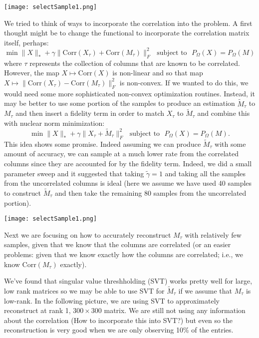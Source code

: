 \documentclass[12pt]{article}
\newcommand{\Corr}{\text{Corr}}
\begin{document}
 \begin{center}
\texttt{[image: selectSample1.png]}\\
\end{center}  
  
\noindent\makebox[\linewidth]{\rule{\textwidth}{2pt}} 
  
 We tried to think of  ways to incorporate the correlation into the problem. A first thought might be to change the functional to incorporate the correlation matrix itself, perhaps: $$\min \| X \|_* + \gamma \| \Corr(X_\tau) + \Corr(M_\tau)\|^2_F \,\,\,\, \text{subject to} \,\,\,\, P_\Omega(X) = P_{\Omega}(M)$$ where $\tau$ represents the collection of columns that are known to be correlated. However, the map $X\mapsto \Corr(X)$ is non-linear and so that map $X\mapsto \| \Corr(X_\tau) - \Corr(M_\tau)\|_F^2$ is non-convex. If we wanted to do this, we would need some more sophisticated non-convex optimization routines. Instead, it may be better to use some portion of the samples to produce an estimation $\tilde M_\tau$ to $M_\tau$ and then insert a fidelity term in order to match $X_\tau$ to $\tilde M_\tau$ and combine this with nuclear norm minimization: $$\min \| X \|_* + \gamma \| X_\tau + \tilde M_\tau\|^2_F \,\,\,\, \text{subject to} \,\,\,\, P_\Omega(X) = P_{\Omega}(M).$$ This idea shows some promise. Indeed assuming we can produce $\tilde M_\tau$ with some amount of accuracy, we can sample at a much lower rate from the correlated columns since they are accounted for by the fidelity term. Indeed, we did a small parameter sweep and it suggested that taking $\tilde \gamma =1$ and taking all the samples from the uncorrelated columns is ideal (here we assume we have used 40 samples to construct $\tilde M_\tau$ and then take the remaining $80$ samples from the uncorrelated portion). 
 
  \begin{center}
\texttt{[image: selectSample1.png]}\\
\end{center}  
  
\noindent\makebox[\linewidth]{\rule{\textwidth}{2pt}} 
  
Next we are focusing on how to accurately reconstruct $M_\tau$ with relatively few samples, given that we know that the columns are correlated (or an easier problems: given that we know exactly how the columns are correlated; i.e., we know $\Corr(M_\tau)$ exactly). 

We've found that singular value threshholding (SVT) works pretty well for large, low rank matrices so we may be able to use SVT for $\tilde M_\tau$ if we assume that $M_\tau$ is low-rank. In the following picture, we are using SVT to approximately reconstruct at rank 1, $300 \times 300$ matrix. We are still not using any information about the correlation (How to incorporate this into SVT?) but even so the reconstruction is very good when we are only observing 10\% of the entries.
\end{document}
